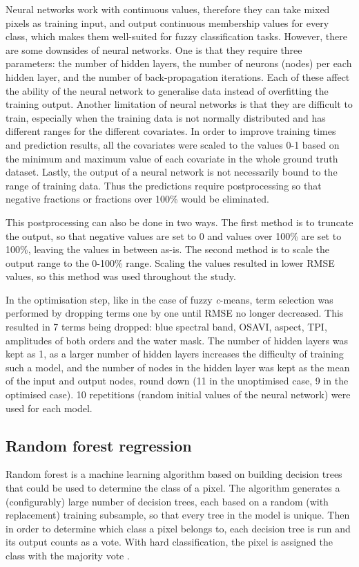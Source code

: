 \documentclass[a4paper,12pt]{scrbook}
\begin{document}
Neural networks work with continuous values, therefore they can take mixed pixels as training input, and output continuous membership values for every class, which makes them well-suited for fuzzy classification tasks. However, there are some downsides of neural networks. One is that they require three parameters: the number of hidden layers, the number of neurons (nodes) per each hidden layer, and the number of back-propagation iterations. Each of these affect the ability of the neural network to generalise data instead of overfitting the training output. Another limitation of neural networks is that they are difficult to train, especially when the training data is not normally distributed and has different ranges for the different covariates. In order to improve training times and prediction results, all the covariates were scaled to the values 0-1 based on the minimum and maximum value of each covariate in the whole ground truth dataset. Lastly, the output of a neural network is not necessarily bound to the range of training data. Thus the predictions require postprocessing so that negative fractions or fractions over 100\% would be eliminated.

This postprocessing can also be done in two ways. The first method is to truncate the output, so that negative values are set to 0 and values over 100\% are set to 100\%, leaving the values in between as-is. The second method is to scale the output range to the 0-100\% range. Scaling the values resulted in lower RMSE values, so this method was used throughout the study.

In the optimisation step, like in the case of fuzzy \textit{c}-means, term selection was performed by dropping terms one by one until RMSE no longer decreased. This resulted in 7 terms being dropped: blue spectral band, OSAVI, aspect, TPI, amplitudes of both orders and the water mask. The number of hidden layers was kept as 1, as a larger number of hidden layers increases the difficulty of training such a model, and the number of nodes in the hidden layer was kept as the mean of the input and output nodes, round down (11 in the unoptimised case, 9 in the optimised case). 10 repetitions (random initial values of the neural network) were used for each model.

\subsection{Random forest regression}

Random forest is a machine learning algorithm based on building decision trees that could be used to determine the class of a pixel. The algorithm generates a (configurably) large number of decision trees, each based on a random (with replacement) training subsample, so that every tree in the model is unique. Then in order to determine which class a pixel belongs to, each decision tree is run and its output counts as a vote. With hard classification, the pixel is assigned the class with the majority vote \citep{walton2008subpixelrf}.
\end{document}
